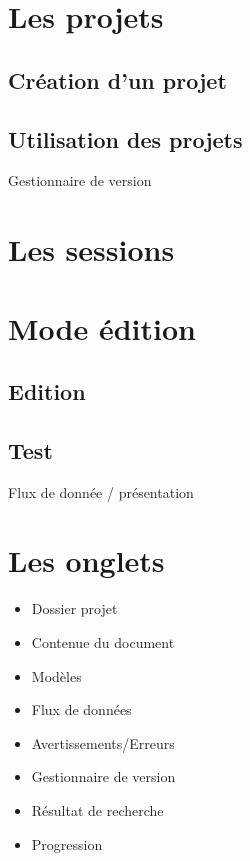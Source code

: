 \documentclass[a4paper,10pt,twoside]{book}
\begin{document}
\section{Les projets}
\label{sec:Projets}

\subsection{Création d'un projet}

\subsection{Utilisation des projets}
\label{sec:RCS}
Gestionnaire de version

\section{Les sessions}

\section{Mode édition}

\subsection{Edition}

\subsection{Test}

Flux de donnée / présentation

\section{Les onglets}
\label{sec:dock}

\begin{itemize}
  \item Dossier projet
  \item Contenue du document
  \item Modèles
  \item Flux de données
  \item Avertissements/Erreurs
  \item Gestionnaire de version
  \item Résultat de recherche
  \item Progression
\end{itemize}
\end{document}
